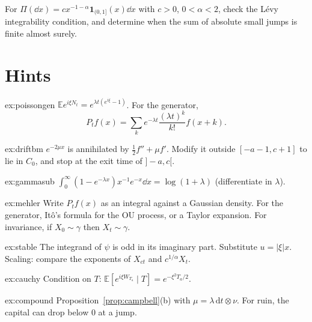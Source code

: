 \begin{exercise}[$\star\star\star$]\label{ex:v12levyintegrals}
For $\Pi(\dd x)=c x^{-1-\alpha}\mathbf1_{(0,1]}(x)\dd x$ with $c>0$, $0<\alpha<2$, check the Lévy integrability condition, and determine when the sum of absolute small jumps is finite almost surely.
\end{exercise}

\section{Hints}

\begin{hint}{ex:poissongen}
$\mathbb Ee^{i\xi N_t}=e^{\lambda t(e^{i\xi}-1)}$. For the generator,
\[
P_tf(x)=\sum_ke^{-\lambda t}\frac{(\lambda t)^k}{k!}f(x+k).
\]

\end{hint}

\begin{hint}{ex:driftbm}
$e^{-2\mu x}$ is annihilated by $\frac12f''+\mu f'$. Modify it outside $[-a-1,c+1]$ to lie in $C_0$, and stop at the exit time of $]-a,c[$.
\end{hint}

\begin{hint}{ex:gammasub}
$\int_0^\infty(1-e^{-\lambda x})x^{-1}e^{-x}\dd x=\log(1+\lambda)$ (differentiate in $\lambda$).
\end{hint}

\begin{hint}{ex:mehler}
Write $P_tf(x)$ as an integral against a Gaussian density. For the generator, It\^o's formula for the OU process, or a Taylor expansion. For invariance, if $X_0\sim\gamma$ then $X_t\sim\gamma$.
\end{hint}

\begin{hint}{ex:stable}
The integrand of $\psi$ is odd in its imaginary part. Substitute $u=|\xi|x$. Scaling: compare the exponents of $X_{ct}$ and $c^{1/\alpha}X_t$.
\end{hint}

\begin{hint}{ex:cauchy}
Condition on $T$: $\mathbb E[e^{i\xi W_{T_a}}\mid T]=e^{-\xi^2T_a/2}$.
\end{hint}

\begin{hint}{ex:compound}
Proposition~\ref{prop:campbell}(b) with $\mu=\lambda\,\mathrm dt\otimes\nu$. For ruin, the capital can drop below $0$ at a jump.
\end{hint}

